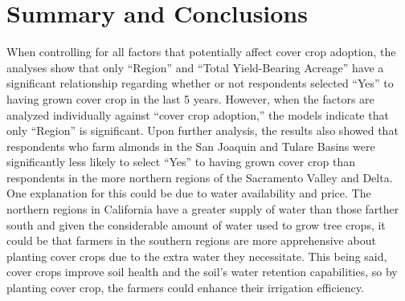 \documentclass[12pt,]{article}
\begin{document}
\begin{table}

\caption{\label{tab:Question 5}Cover Crop Adoption by Region}
\centering
{}
\end{table}

\newpage

\section{Summary and Conclusions}\label{summary-and-conclusions}

When controlling for all factors that potentially affect cover crop
adoption, the analyses show that only ``Region'' and ``Total
Yield-Bearing Acreage'' have a significant relationship regarding
whether or not respondents selected ``Yes'' to having grown cover crop
in the last 5 years. However, when the factors are analyzed individually
against ``cover crop adoption,'' the models indicate that only
``Region'' is significant. Upon further analysis, the results also
showed that respondents who farm almonds in the San Joaquin and Tulare
Basins were significantly less likely to select ``Yes'' to having grown
cover crop than respondents in the more northern regions of the
Sacramento Valley and Delta. One explanation for this could be due to
water availability and price. The northern regions in California have a
greater supply of water than those farther south and given the
considerable amount of water used to grow tree crops, it could be that
farmers in the southern regions are more apprehensive about planting
cover crops due to the extra water they necessitate. This being said,
cover crops improve soil health and the soil's water retention
capabilities, so by planting cover crop, the farmers could enhance their
irrigation efficiency.
\end{document}
